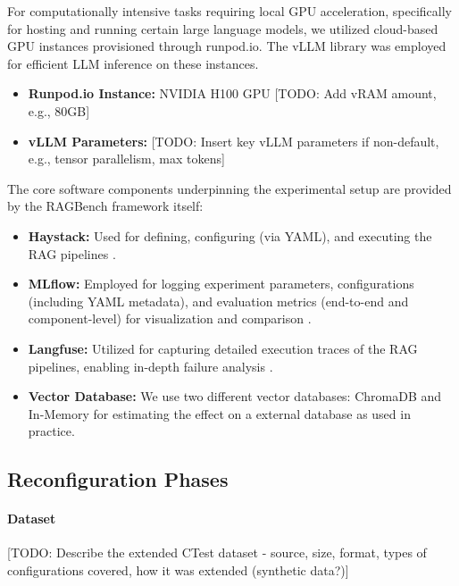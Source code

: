 For computationally intensive tasks requiring local GPU acceleration, specifically for hosting and running certain large language models, we utilized cloud-based GPU instances provisioned through runpod.io. The vLLM library \cite{Kwon.12.09.2023} was employed for efficient LLM inference on these instances.

\begin{itemize}
    \item \textbf{Runpod.io Instance:} NVIDIA H100 GPU [TODO: Add vRAM amount, e.g., 80GB]
    \item \textbf{vLLM Parameters:} [TODO: Insert key vLLM parameters if non-default, e.g., tensor parallelism, max tokens]
\end{itemize}

The core software components underpinning the experimental setup are provided by the RAGBench framework itself:
\begin{itemize}
    \item \textbf{Haystack:} Used for defining, configuring (via YAML), and executing the RAG pipelines \cite{Pietsch_Haystack_the_end-to-end_2019}.
    \item \textbf{MLflow:} Employed for logging experiment parameters, configurations (including YAML metadata), and evaluation metrics (end-to-end and component-level) for visualization and comparison \cite{MLflow}.
    \item \textbf{Langfuse:} Utilized for capturing detailed execution traces of the RAG pipelines, enabling in-depth failure analysis \cite{Langfuse}.
    \item \textbf{Vector Database:} We use two different vector databases: ChromaDB and In-Memory for estimating the effect on a external database as used in practice.
\end{itemize}


\subsection{Reconfiguration Phases} \label{sec:exp_results} %


\paragraph{Dataset} %
[TODO: Describe the extended CTest dataset - source, size, format, types of configurations covered, how it was extended (synthetic data?)]

